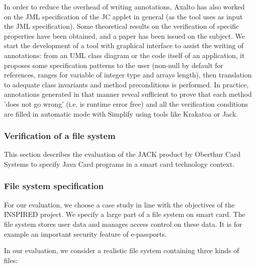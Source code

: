 In order to reduce the overhead of writing annotations, Axalto has
also worked on the JML specification of the JC applet in general (as
the tool uses as input the JML specification). Some theoretical
results on the verification of specific properties have been obtained,
and a paper has been issued on the subject\cite{Rousset}. We start the
development of a tool with graphical interface to assist the writing
of annotations: from an UML class diagram or the code itself of an
application, it proposes some specification patterns to the user
(non-null by default for references, ranges for variable of integer
type and arrays length), then translation to adequate class invariants
and method preconditions is performed. In practice, annotations
generated in that manner reveal sufficient to prove that each method
'does not go wrong' (i.e. is runtime error free) and all the
verification conditions are filled in automatic mode with Simplify
using tools like Krakatoa or Jack.

\subsubsection{Verification of a file system}
This section describes the evaluation of the JACK product by Oberthur
Card Systems to specify Java Card programs in a smart card technology
context.

\subsubsection{File system specification}
For our evaluation, we choose a case study in line with the objectives
of the INSPIRED project. We specify a large part of a file system on
smart card. The file system stores user data and manages access
control on these data. It is for example an important security feature
of e-passports.

In our evaluation, we consider a realistic file system containing
three kinds of files:

